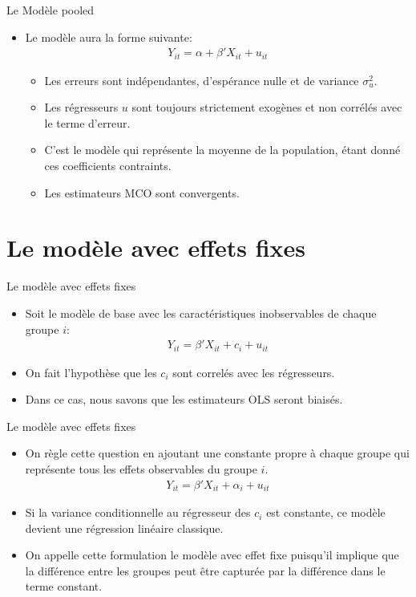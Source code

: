 \documentclass{beamer}
\begin{document}
\begin{frame}{Le Modèle pooled}
\begin{itemize}
\item Le modèle aura la forme suivante:
\begin{align*}
Y_{it}=\alpha+\beta' X_{it}+u_{it}
\end{align*}
\begin{itemize}
\item Les erreurs sont indépendantes, d’espérance nulle et de variance $\sigma_u^2$.
\item Les régresseurs $u$ sont toujours strictement exogènes et non corrélés avec le terme d’erreur.
\item C’est le modèle qui représente la moyenne de la population, étant donné ces coefficients contraints. 
\item Les estimateurs MCO sont convergents. 
\end{itemize}
\end{itemize}
\end{frame}

\section{Le modèle avec effets fixes}
\frame{\tableofcontents[current]}
\begin{frame}{Le modèle avec effets fixes}
\begin{itemize}
\item Soit le modèle de base avec les caractéristiques inobservables de chaque groupe $i$:
\begin{align*}
Y_{it}=\beta'X_{it}+c_i+u_{it}
\end{align*}
\item On fait l’hypothèse que les $c_i$ sont correlés avec les régresseurs.
\item Dans ce cas, nous savons que les estimateurs OLS seront biaisés. 
\end{itemize}
\end{frame}


\begin{frame}{Le modèle avec effets fixes}
\begin{itemize}
\item On règle cette question en ajoutant une constante propre à chaque groupe qui représente tous les effets observables du groupe $i$.
\begin{align*}
Y_{it}=\beta'X_{it}+\alpha_i+u_{it}
\end{align*} 
\item Si la variance conditionnelle au régresseur des $c_i$ est constante, ce modèle devient une régression linéaire classique.
\item On appelle cette formulation le modèle avec effet fixe puisqu’il implique que la différence entre les groupes peut être capturée par la différence dans le terme constant. 
\end{itemize}
\end{frame}
\end{document}
